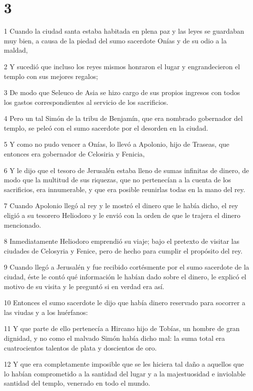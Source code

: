\chapter{3}

\par 1 Cuando la ciudad santa estaba habitada en plena paz y las leyes se guardaban muy bien, a causa de la piedad del sumo sacerdote Onías y de su odio a la maldad,
\par 2 Y sucedió que incluso los reyes mismos honraron el lugar y engrandecieron el templo con sus mejores regalos;
\par 3 De modo que Seleuco de Asia se hizo cargo de sus propios ingresos con todos los gastos correspondientes al servicio de los sacrificios.
\par 4 Pero un tal Simón de la tribu de Benjamín, que era nombrado gobernador del templo, se peleó con el sumo sacerdote por el desorden en la ciudad.
\par 5 Y como no pudo vencer a Onías, lo llevó a Apolonio, hijo de Traseas, que entonces era gobernador de Celosiria y Fenicia,
\par 6 Y le dijo que el tesoro de Jerusalén estaba lleno de sumas infinitas de dinero, de modo que la multitud de sus riquezas, que no pertenecían a la cuenta de los sacrificios, era innumerable, y que era posible reunirlas todas en la mano del rey.
\par 7 Cuando Apolonio llegó al rey y le mostró el dinero que le había dicho, el rey eligió a su tesorero Heliodoro y le envió con la orden de que le trajera el dinero mencionado.
\par 8 Inmediatamente Heliodoro emprendió su viaje; bajo el pretexto de visitar las ciudades de Celosyria y Fenice, pero de hecho para cumplir el propósito del rey.
\par 9 Cuando llegó a Jerusalén y fue recibido cortésmente por el sumo sacerdote de la ciudad, éste le contó qué información le habían dado sobre el dinero, le explicó el motivo de su visita y le preguntó si en verdad era así.
\par 10 Entonces el sumo sacerdote le dijo que había dinero reservado para socorrer a las viudas y a los huérfanos:
\par 11 Y que parte de ello pertenecía a Hircano hijo de Tobías, un hombre de gran dignidad, y no como el malvado Simón había dicho mal: la suma total era cuatrocientos talentos de plata y doscientos de oro.
\par 12 Y que era completamente imposible que se les hiciera tal daño a aquellos que lo habían comprometido a la santidad del lugar y a la majestuosidad e inviolable santidad del templo, venerado en todo el mundo.
